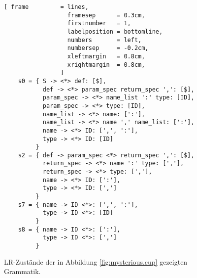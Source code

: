 \begin{figure}[!ht]
\centering
\begin{Verbatim}[ frame         = lines, 
                  framesep      = 0.3cm, 
                  firstnumber   = 1,
                  labelposition = bottomline,
                  numbers       = left,
                  numbersep     = -0.2cm,
                  xleftmargin   = 0.8cm,
                  xrightmargin  = 0.8cm,
                ]
    s0 = { S -> <*> def: [$],
           def -> <*> param_spec return_spec ',': [$],
           param_spec -> <*> name_list ':' type: [ID],
           param_spec -> <*> type: [ID],
           name_list -> <*> name: [':'],
           name_list -> <*> name ',' name_list: [':'],
           name -> <*> ID: [',', ':'],
           type -> <*> ID: [ID]
         }
    s2 = { def -> param_spec <*> return_spec ',': [$],
           return_spec -> <*> name ':' type: [','],
           return_spec -> <*> type: [','],
           name -> <*> ID: [':'],
           type -> <*> ID: [',']
         }
    s7 = { name -> ID <*>: [',', ':'],
           type -> ID <*>: [ID]
         }
    s8 = { name -> ID <*>: [':'],
           type -> ID <*>: [',']
         }
\end{Verbatim}
\vspace*{-0.3cm}
\caption{LR-Zust\"ande der in Abbildung \ref{fig:mysterious.cup} gezeigten Grammatik.}
\label{fig:mysterious.txt}
\end{figure} %


